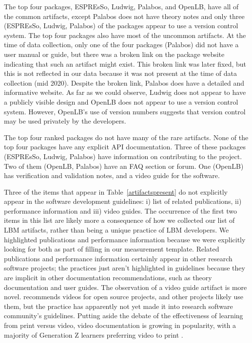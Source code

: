 \documentclass[final, 3p, times, authoryear]{elsarticle}
\begin{document}
The top four packages, ESPREsSo, Ludwig, Palabos, and OpenLB, have all of the
common artifacts, except Palabos does not have theory notes and only three
(ESPREsSo, Ludwig, Palabos) of the packages appear to use a version control
system.  The top four packages also have most of the uncommon artifacts. At
the time of data collection, only one of the four packages (Palabos) did not
have a user manual or guide, but there was a broken link on the package website
indicating that such an artifact might exist. This broken link was later fixed,
but this is not reflected in our data because it was not present at the time of
data collection (mid 2020). Despite the broken link, Palabos does have a
detailed and informative website. As far as we could observe, Ludwig does not
appear to have a publicly visible design and OpenLB does not appear to use a
version control system. However, OpenLB's use of version numbers suggests that
version control may be used privately by the developers.

The top four ranked packages do not have many of the rare artifacts. None of the
top four packages have any explicit API documentation. Three of these packages
(ESPREsSo, Ludwig, Palabos) have information on contributing to the project. Two
of them (OpenLB, Palabos) have an FAQ section or forum. One (OpenLB) has
verification and validation notes, and a video guide for the software. 

Three of the items that appear in Table~\ref{artifactspresent} do not explicitly
appear in the software development guidelines: i) list of related publications,
ii) performance information and iii) video guides.  The occurrence of the first
two items in this list are likely more a consequence of how we collected our
list of LBM artifacts, rather than being a unique practice of LBM developers. We
highlighted publications and performance information because we were explicitly
looking for both as part of filling in our measurement template. Related
publications and performance information certainly appear in other research
software projects; the practices just aren't highlighted in guidelines because
they are implicit in other documentation recommendations, such as theory
documentation and user guides. The observation of a video guide artifact is more
novel.  \citet{Fogel2005} recommends videos for open source projects, and other
projects likely use them, but the practice has apparently not yet made it into
research software community's guidelines.  Putting aside the debate of the
effectiveness of learning from print versus video, video documentation is
growing in popularity, with a majority of Generation Z learners preferring video
to print \citep{Genota2018}.
\end{document}
